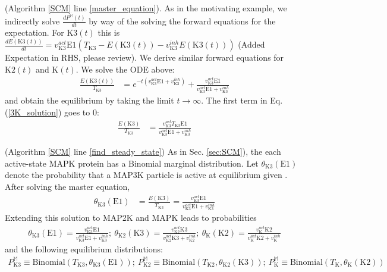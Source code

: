 \documentclass{article}
\def\eqref#1{Eq. (\ref{#1})}
\def\secref#1{Sec. \ref{#1}}
\begin{document}
 (Algorithm \ref{SCM} line \ref{master_equation}).
As in the motivating example, we indirectly solve $\frac{dP^{\mathbb{M}}(t)}{dt}$ by way of the solving the forward equations for the expectation.  For $\text{K3}(t)$ this is $\frac{dE(\text{K3}(t))}{dt} = v^{act}_{\text{K3}}\text{E1}(T_{\text{K3}}-E({\text{K3}(t)}) - v^{inh}_{\text{K3}}E(\text{K3}(t)))$ (Added Expectation in RHS, please review). We derive similar forward equations for $\text{K2}( t)$ and $\text{K}( t)$.
We solve the ODE above:
 \begin{align}
\frac{E(\text{K3}(t))}{T_{\text{K3}}} &= e^{-t(v^{act}_{\text{K3}}\text{E1} + v^{inh}_{\text{K3}})} + \frac{v^{act}_{\text{K3}}\text{E1}}{v^{act}_{\text{K3}}\text{E1} + v^{inh}_{\text{K3}}}
 \label{3K_solution}
 \end{align}
and obtain the equilibrium by taking the limit $t \rightarrow \infty$. The first term in \eqref{3K_solution} goes to 0:
 \begin{align}
\frac{E(\text{K3})}{T_{\text{K3}}} &= \frac{v^{act}_{\text{K3}}T_{\text{K3}}\text{E1}}{v^{act}_{\text{K3}}\text{E1} + v^{inh}_{\text{K3}}}
 \label{3K_ss}
 \end{align}

 (Algorithm \ref{SCM} line \ref{find_steady_state})
As in \secref{sec:SCM}), the each active-state MAPK protein has a Binomial marginal distribution.
Let $\theta_{\text{K3}}(\text{E1})$ denote the probability that a MAP3K particle is active at equilibrium given .
After solving the master equation,
\vspace{-2mm}
\begin{align}
\theta_{\text{K3}}(\text{E1}) &= \frac{E(\text{K3})}{T_{\text{K3}}}=\frac{v^{act}_{\text{K3}}\text{E1}}{v^{act}_{\text{K3}}\text{E1} + v^{inh}_{\text{K3}}} \label{3K_equiv}
\end{align}
 Extending this solution to MAP2K and MAPK leads to probabilities
 \vspace{-2mm}
\begin{eqnarray}
\theta_{\text{K3}}(\text{E1}) = \frac{v^{act}_{\text{K3}}\text{E1}}{v^{act}_{\text{K3}}\text{E1} + v^{inh}_{\text{K3}}} ; \ 
\theta_{\text{K2}}(\text{K3}) = \frac{v^{act}_{\text{K2}}\text{K3}}{v^{act}_{\text{K2}}\text{K3} + v^{inh}_{\text{K2}}} ; \ 
\theta_{\text{K}}(\text{K2}) = \frac{v^{act}_{\text{K}}\text{K2}}{v^{act}_{\text{K}}\text{K2} + v^{inh}_{\text{K}}} \label{K_equilibrium}
\end{eqnarray}
and the following equilibrium distributions:
\vspace{-2mm}
\begin{eqnarray}
P_{\text{K3}}^{\mathbb{M}} \equiv \text{Binomial}(T_{\text{K3}}, \theta_{\text{K3}}(\text{E1})); \
P_{\text{K2}}^{\mathbb{M}} \equiv \text{Binomial}(T_{\text{K2}}, \theta_{\text{K2}}(\text{K3})); \
P_{\text{K}}^{\mathbb{M}} \equiv \text{Binomial}(T_{\text{K}}, \theta_{\text{K}}(\text{K2})) \label{binom_k}
\end{eqnarray}
\end{document}
